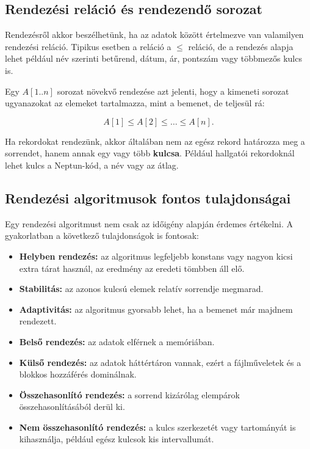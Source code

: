 \subsection{Rendezési reláció és rendezendő sorozat}

Rendezésről akkor beszélhetünk, ha az adatok között értelmezve van valamilyen rendezési reláció. Tipikus esetben a reláció a $\leq$ reláció, de a rendezés alapja lehet például név szerinti betűrend, dátum, ár, pontszám vagy többmezős kulcs is.

Egy $A[1..n]$ sorozat növekvő rendezése azt jelenti, hogy a kimeneti sorozat ugyanazokat az elemeket tartalmazza, mint a bemenet, de teljesül rá:

\[
A[1] \leq A[2] \leq \dots \leq A[n].
\]

Ha rekordokat rendezünk, akkor általában nem az egész rekord határozza meg a sorrendet, hanem annak egy vagy több \textbf{kulcsa}. Például hallgatói rekordoknál lehet kulcs a Neptun-kód, a név vagy az átlag.

\subsection{Rendezési algoritmusok fontos tulajdonságai}

Egy rendezési algoritmust nem csak az időigény alapján érdemes értékelni. A gyakorlatban a következő tulajdonságok is fontosak:

\begin{itemize}
  \item \textbf{Helyben rendezés:} az algoritmus legfeljebb konstans vagy nagyon kicsi extra tárat használ, az eredmény az eredeti tömbben áll elő.
  \item \textbf{Stabilitás:} az azonos kulcsú elemek relatív sorrendje megmarad.
  \item \textbf{Adaptivitás:} az algoritmus gyorsabb lehet, ha a bemenet már majdnem rendezett.
  \item \textbf{Belső rendezés:} az adatok elférnek a memóriában.
  \item \textbf{Külső rendezés:} az adatok háttértáron vannak, ezért a fájlműveletek és a blokkos hozzáférés dominálnak.
  \item \textbf{Összehasonlító rendezés:} a sorrend kizárólag elempárok összehasonlításából derül ki.
  \item \textbf{Nem összehasonlító rendezés:} a kulcs szerkezetét vagy tartományát is kihasználja, például egész kulcsok kis intervallumát.
\end{itemize}

